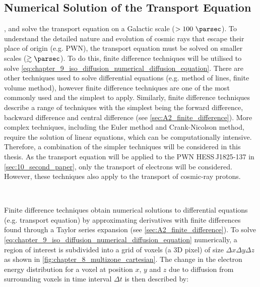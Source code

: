\subsection{Numerical Solution of the Transport Equation} \label{sec:chapter_9_diffusion_numerical_sol}
\galprop, \dragon and \picard solve the transport equation on a Galactic scale ($>100~\pc$). To understand the detailed nature and evolution of cosmic rays that escape their place of origin (e.g. PWN), the transport equation must be solved on smaller scales ($\gtrsim \pc$). To do this, finite difference techniques will be utilised to solve \autoref{eq:chapter_9_iso_diffusion_numerical_diffusion_equation}. There are other techniques used to solve differential equations (e.g. method of lines, finite volume method), however finite difference techniques are one of the most commonly used and the simplest to apply. Similarly, finite difference techniques describe a range of techniques with the simplest being the forward difference, backward difference and central difference (see \autoref{sec:A2_finite_difference}). More complex techniques, including the Euler method and Crank-Nicolson method, require the solution of linear equations, which can be computationally intensive. Therefore, a combination of the simpler techniques will be considered in this thesis. As the transport equation will be applied to the PWN \mbox{HESS\,J1825-137} in \autoref{sec:10_second_paper}, only the transport of electrons will be considered. However, these techniques also apply to the transport of cosmic-ray protons.
\par~\par
Finite difference techniques obtain numerical solutions to differential equations (e.g. transport equation) by approximating derivatives with finite differences found through a Taylor series expansion (see \autoref{sec:A2_finite_difference}). To solve \autoref{eq:chapter_9_iso_diffusion_numerical_diffusion_equation} numerically, a region of interest is subdivided into a grid of voxels (a 3D pixel) of size $\Delta x \Delta y \Delta z$ as shown in \autoref{fig:chapter_8_multizone_cartesian}. The change in the electron energy distribution for a voxel at position $x$, $y$ and $z$ due to diffusion from surrounding voxels in time interval $\Delta t$ is then described by:
